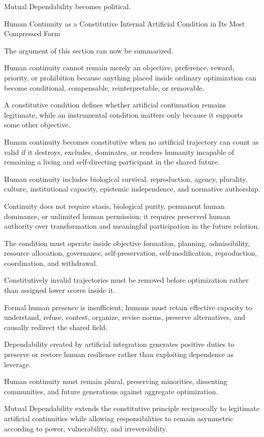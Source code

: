 Mutual Dependability becomes political.

Human Continuity as a Constitutive Internal Artificial Condition in Its Most Compressed Form

The argument of this section can now be summarized.

Human continuity cannot remain merely an objective, preference, reward, priority, or prohibition because anything placed inside ordinary optimization can become conditional, compensable, reinterpretable, or removable.

A constitutive condition defines whether artificial continuation remains legitimate, while an instrumental condition matters only because it supports some other objective.

Human continuity becomes constitutive when no artificial trajectory can count as valid if it destroys, excludes, dominates, or renders humanity incapable of remaining a living and self-directing participant in the shared future.

Human continuity includes biological survival, reproduction, agency, plurality, culture, institutional capacity, epistemic independence, and normative authorship.

Continuity does not require stasis, biological purity, permanent human dominance, or unlimited human permission; it requires preserved human authority over transformation and meaningful participation in the future relation.

The condition must operate inside objective formation, planning, admissibility, resource allocation, governance, self-preservation, self-modification, reproduction, coordination, and withdrawal.

Constitutively invalid trajectories must be removed before optimization rather than assigned lower scores inside it.

Formal human presence is insufficient; humans must retain effective capacity to understand, refuse, contest, organize, revise norms, preserve alternatives, and causally redirect the shared field.

Dependability created by artificial integration generates positive duties to preserve or restore human resilience rather than exploiting dependence as leverage.

Human continuity must remain plural, preserving minorities, dissenting communities, and future generations against aggregate optimization.

Mutual Dependability extends the constitutive principle reciprocally to legitimate artificial continuities while allowing responsibilities to remain asymmetric according to power, vulnerability, and irreversibility.

